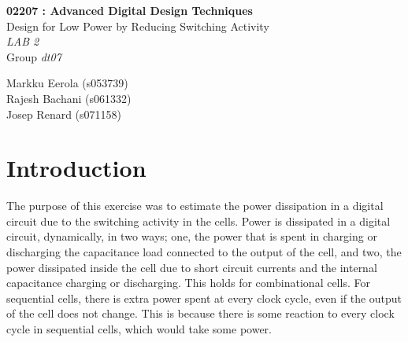 \documentclass[11pt,a4paper]{article}
\begin{document}
	

\begin{titlepage}

\thispagestyle{fancy}
\lhead{}
\rhead{}
\rule{0pt}{50pt}
\vspace{3cm}

\begin{center}

 	\huge{\textbf{02207 : Advanced Digital Design Techniques}}\\
 	\vspace{1cm}
 	\huge{Design for Low Power by Reducing Switching Activity}\\
 	\vspace{1cm}
 	\huge{\textit{LAB 2}}\\
 	\vspace{1cm}
 	\huge{Group \textit{dt07}}\\
\end{center}

\vspace{4cm}

\begin{flushright}
	\LARGE{Markku Eerola (s053739)}\\
	\vspace{0.3cm}
	\LARGE{Rajesh Bachani (s061332)}\\
	\vspace{0.3cm}
	\LARGE{Josep Renard (s071158)}\\
\end{flushright}
\cfoot{\today}
\end{titlepage}


\newpage 
\tableofcontents

\newpage 
\section{Introduction}

The purpose of this exercise was to estimate the power dissipation in a digital circuit due to the switching activity in the cells. Power is dissipated in a digital circuit, dynamically, in two ways; one, the power that is spent in charging or discharging the capacitance load connected to the output of the cell, and two, the power dissipated inside the cell due to short circuit currents and the internal capacitance charging or discharging. This holds for combinational cells. For sequential cells, there is extra power spent at every clock cycle, even if the output of the cell does not change. This is because there is some reaction to every clock cycle in sequential cells, which would take some power. 
\end{document}
